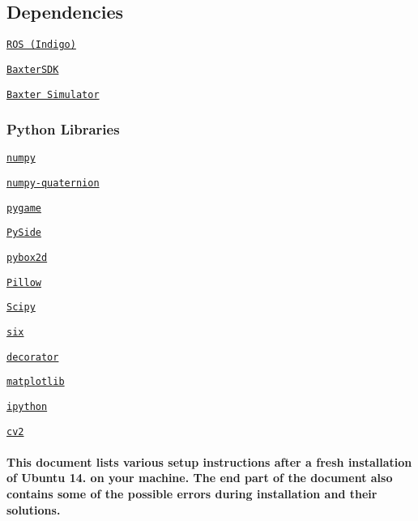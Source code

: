 \subsection*{Dependencies}


\begin{DoxyItemize}
\item \href{http://wiki.ros.org/indigo/Installation/Ubuntu}{\tt R\-O\-S (Indigo)}
\item \href{http://sdk.rethinkrobotics.com/wiki/Hello_Baxter}{\tt Baxter\-S\-D\-K}
\item \href{http://sdk.rethinkrobotics.com/wiki/Simulator_Installation}{\tt Baxter Simulator}
\end{DoxyItemize}

\subsubsection*{Python Libraries}


\begin{DoxyItemize}
\item \href{http://www.numpy.org/}{\tt numpy}
\item \href{https://pypi.python.org/pypi/numpy-quaternion}{\tt numpy-\/quaternion}
\item \href{http://www.pygame.org/download.shtml}{\tt pygame}
\item \href{https://pypi.python.org/pypi/PySide/1.2.4}{\tt Py\-Side}
\item \href{https://github.com/pybox2d/pybox2d}{\tt pybox2d}
\item \href{https://pypi.python.org/pypi/Pillow/4.1.1}{\tt Pillow}
\item \href{https://pypi.python.org/pypi/scipy/0.19.0}{\tt Scipy}
\item \href{https://pypi.python.org/pypi/six/1.10.0}{\tt six}
\item \href{https://pypi.python.org/pypi/decorator/4.0.11}{\tt decorator}
\item \href{https://pypi.python.org/pypi/matplotlib/2.0.1}{\tt matplotlib}
\item \href{https://pypi.python.org/pypi/ipython/6.0.0}{\tt ipython}
\item \href{https://github.com/opencv/opencv}{\tt cv2}
\end{DoxyItemize}

\paragraph*{This document lists various setup instructions after a fresh installation of Ubuntu 14. on your machine. The end part of the document also contains some of the possible errors during installation and their solutions.}


